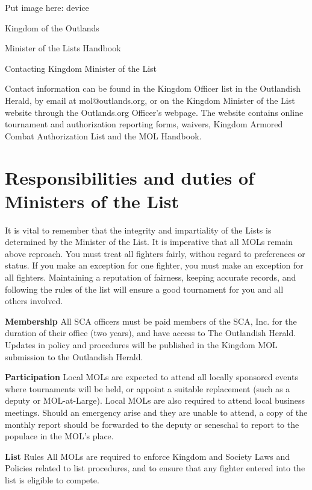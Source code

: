 \documentclass{article}
\begin{document}
Put image here: device


\begin{center}
{\Huge
Kingdom of the Outlands

Minister of the Lists
Handbook

}\end{center}

\tableofcontents Contacting Kingdom Minister of the List

Contact information can be found in the Kingdom Officer list in the Outlandish Herald, by email at
mol@outlands.org, or on the Kingdom Minister of the List website through the Outlands.org
Officer’s webpage. The website contains online tournament and authorization reporting forms,
waivers, Kingdom Armored Combat Authorization List and the MOL Handbook.


\section{Responsibilities and duties of Ministers of the List}

It is vital to remember that the integrity and impartiality of the Lists is determined by the Minister of the
List. It is imperative that all MOLs remain above reproach.
You must treat all fighters fairly, withou regard to preferences or status.
If you make an exception for one fighter, you must make an exception
for all fighters. Maintaining a reputation of fairness, keeping accurate records, and following the rules
of the list will ensure a good tournament for you and all others involved.


\textbf{Membership} All SCA officers must be paid members of the SCA, Inc. for the duration of their office
(two years), and have access to The Outlandish Herald. Updates in policy and procedures
will be published in the Kingdom MOL submission to the Outlandish Herald.


\textbf{Participation} Local MOLs are expected to attend all locally sponsored events where tournaments will be
held, or appoint a suitable replacement (such as a deputy or MOL-at-Large). Local MOLs
are also required to attend local business meetings. Should an emergency arise and they
are unable to attend, a copy of the monthly report should be forwarded to the deputy or
seneschal to report to the populace in the MOL’s place.

\textbf{List} Rules All MOLs are required to enforce Kingdom and Society Laws and Policies related
to list procedures, and to ensure that any fighter entered into the list is eligible to compete.
\end{document}
